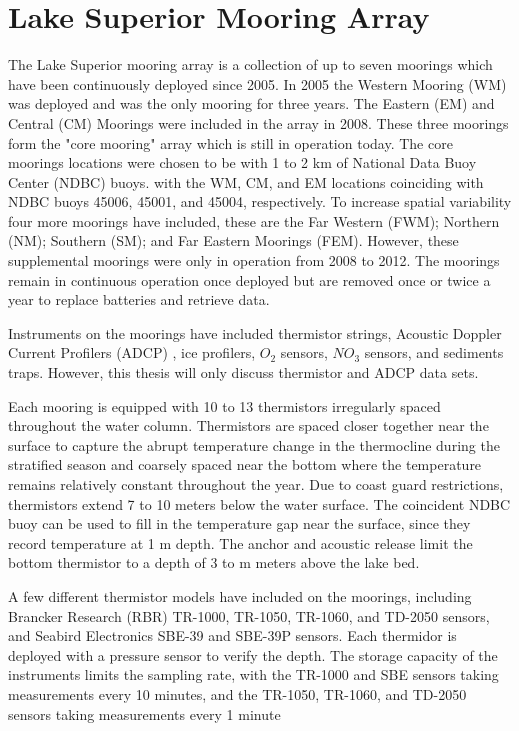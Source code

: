 \section{Lake Superior Mooring Array}
The Lake Superior mooring array is a collection of up to seven moorings which have been continuously deployed since 2005. 
In 2005 the Western Mooring (WM) was deployed and was the only mooring for three years. The Eastern (EM) and Central (CM) Moorings
were included in the array in 2008. These three moorings form the "core mooring" array which is still in operation today. 
The core moorings locations were chosen to be with 1 to 2 km of National Data Buoy Center (NDBC) buoys. with the WM, CM, and EM 
locations coinciding with NDBC buoys 45006, 45001, and 45004, respectively. To increase spatial variability four more moorings have included, 
these are the Far Western (FWM); Northern (NM); Southern (SM); and  Far Eastern Moorings (FEM). 
However, these supplemental moorings were only in operation from 2008 to 2012. 
The moorings remain in continuous operation once deployed but are removed once or twice a year to replace batteries and retrieve data. 

Instruments on the moorings have included thermistor strings, Acoustic Doppler Current Profilers (ADCP) \citep{bugnon_1991}, ice profilers, $O_2$ sensors, 
$NO_3$ sensors, and sediments traps. However, this thesis will only discuss thermistor and ADCP data sets. 

Each mooring is equipped with 10 to 13 thermistors irregularly spaced throughout the water column. Thermistors are spaced closer together near
the surface to capture the abrupt temperature change in the thermocline during the stratified season and coarsely spaced near the bottom 
where the temperature remains relatively constant throughout the year. Due to coast guard restrictions, thermistors extend 7 to 10 meters below the water surface. 
The coincident NDBC buoy can be used to fill in the temperature gap near the surface, since they record temperature at 1 m depth. 
The anchor and acoustic release limit the bottom thermistor to a depth of 3 to m meters above the lake bed. 

A few different thermistor models have included on the moorings, including Brancker Research (RBR) TR-1000, TR-1050, TR-1060, and TD-2050 sensors, 
and Seabird Electronics SBE-39 and SBE-39P sensors. Each thermidor is deployed with a pressure sensor to verify the depth. The storage capacity 
of the instruments limits the sampling rate, with the TR-1000 and SBE sensors taking measurements every 10 minutes, and the TR-1050, TR-1060, 
and TD-2050 sensors taking measurements every 1 minute


